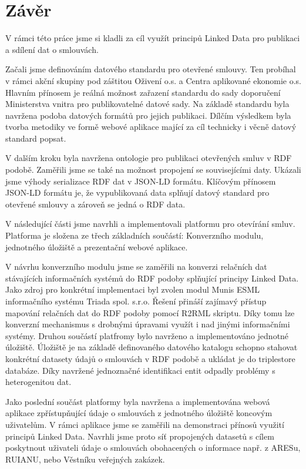 \chapter*{Závěr}

V rámci této práce jsme si kladli za cíl využít principů Linked Data pro publikaci a sdílení dat o smlouvách. 

Začali jsme definováním datového standardu pro otevřené smlouvy. Ten probíhal v rámci akční skupiny pod záštitou Oživení o.s. a Centra aplikované ekonomie o.s. Hlavním přínosem je reálná možnost zařazení standardu do sady doporučení Ministerstva vnitra pro publikovatelné datové sady. Na základě standardu byla navržena podoba datových formátů pro jejich publikaci. Dílčím výsledkem byla tvorba metodiky ve formě webové aplikace mající za cíl technicky i věcně datový standard popsat. 

V dalším kroku byla navržena ontologie pro publikaci otevřených smluv v RDF podobě. Zaměřili jsme se také na možnost propojení se souvisejícími daty. Ukázali jsme výhody serializace RDF dat v JSON-LD formátu. Klíčovým přínosem JSON-LD formátu je, že vypublikovaná data splňují datový standard pro otevřené smlouvy a zároveň se jedná o RDF data. 

V následující části jsme navrhli a implementovali platformu pro otevírání smluv. Platforma je složena ze třech základních součástí: Konverzního modulu, jednotného úložiště a prezentační webové aplikace. 

V návrhu konverzního modulu jsme se zaměřili na konverzi relačních dat stávajících informačních systémů do RDF podoby splňující principy Linked Data. Jako zdroj pro konkrétní implementaci byl zvolen modul Munis ESML informačního systému Triada spol. s.r.o. Řešení přináší zajímavý přístup mapování relačních dat do RDF podoby pomocí R2RML skriptu. Díky tomu lze konverzní mechanismus s drobnými úpravami využít i nad jinými informačními systémy.
Druhou součástí platfromy bylo navrženo a implementováno jednotné úložiště. Úložiště je na základě definovaného datového katalogu schopno stahovat konkrétní datasety údajů o smlouvách v RDF podobě a ukládat je do triplestore databáze. Díky navržené jednoznačné identifikaci entit odpadly problémy s heterogenitou dat. 

Jako poslední součást platformy byla navržena a implementována webová aplikace zpřístupňující údaje o smlouvách z jednotného úložiště koncovým uživatelům. V rámci aplikace jsme se zaměřili na demonstraci přínosů využití principů Linked Data. Navrhli jsme proto síť propojených datasetů s cílem poskytnout uživateli údaje o smlouvách obohacených o informace např. z ARESu, RUIANU, nebo Věstníku veřejných zakázek.


